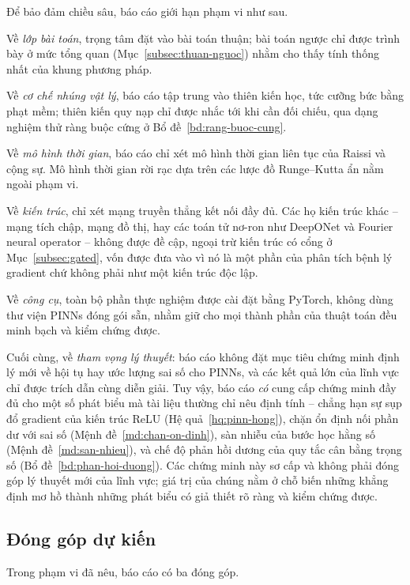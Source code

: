 Để bảo đảm chiều sâu, báo cáo giới hạn phạm vi như sau.
 
Về \emph{lớp bài toán}, trọng tâm đặt vào bài toán thuận; bài toán ngược chỉ được
trình bày ở mức tổng quan (Mục~\ref{subsec:thuan-nguoc}) nhằm cho thấy tính thống
nhất của khung phương pháp.
 
Về \emph{cơ chế nhúng vật lý}, báo cáo tập trung vào thiên kiến học, tức cưỡng
bức bằng phạt mềm; thiên kiến quy nạp chỉ được nhắc tới khi cần đối chiếu, qua
dạng nghiệm thử ràng buộc cứng ở Bổ đề~\ref{bd:rang-buoc-cung}.
 
Về \emph{mô hình thời gian}, báo cáo chỉ xét mô hình thời gian liên tục của
Raissi và cộng sự. Mô hình thời gian rời rạc dựa trên các lược đồ Runge--Kutta ẩn
nằm ngoài phạm vi.
 
Về \emph{kiến trúc}, chỉ xét mạng truyền thẳng kết nối đầy đủ. Các họ kiến trúc
khác -- mạng tích chập, mạng đồ thị, hay các toán tử nơ-ron như DeepONet và Fourier
neural operator -- không được đề cập, ngoại trừ kiến trúc có cổng ở
Mục~\ref{subsec:gated}, vốn được đưa vào vì nó là một phần của phân tích bệnh lý
gradient chứ không phải như một kiến trúc độc lập.
 
Về \emph{công cụ}, toàn bộ phần thực nghiệm được cài đặt bằng PyTorch, không dùng
thư viện PINNs đóng gói sẵn, nhằm giữ cho mọi thành phần của thuật toán đều minh
bạch và kiểm chứng được.
 
Cuối cùng, về \emph{tham vọng lý thuyết}: báo cáo không đặt mục tiêu chứng minh
định lý mới về hội tụ hay ước lượng sai số cho PINNs, và các kết quả lớn của lĩnh
vực chỉ được trích dẫn cùng diễn giải. Tuy vậy, báo cáo \emph{có} cung cấp chứng
minh đầy đủ cho một số phát biểu mà tài liệu thường chỉ nêu định tính -- chẳng hạn
sự sụp đổ gradient của kiến trúc ReLU (Hệ quả~\ref{hq:pinn-hong}), chặn ổn định
nối phần dư với sai số (Mệnh đề~\ref{md:chan-on-dinh}), sàn nhiễu của bước học
hằng số (Mệnh đề~\ref{md:san-nhieu}), và chế độ phản hồi dương của quy tắc cân
bằng trọng số (Bổ đề~\ref{bd:phan-hoi-duong}). Các chứng minh này sơ cấp và không
phải đóng góp lý thuyết mới của lĩnh vực; giá trị của chúng nằm ở chỗ biến những
khẳng định mơ hồ thành những phát biểu có giả thiết rõ ràng và kiểm chứng được.
 
\subsection{Đóng góp dự kiến}
 
Trong phạm vi đã nêu, báo cáo có ba đóng góp.
 

